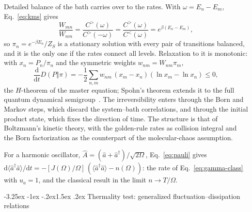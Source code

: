 \documentclass[10pt,a4paper]{article}
\makeatletter
\renewcommand{\subsection}{\@startsection{subsection}{2}{\z@}%
  {-3.25ex \@plus -1ex \@minus -.2ex}{1.5ex \@plus .2ex}%
  {\normalfont\fontsize{15.5pt}{19pt}\selectfont\bfseries}}
\newcommand{\dd}{\mathrm{d}}
\makeatother
\begin{document}
Detailed balance of the bath carries over to the rates.
With $ \omega = E_n - E_m $, Eq.~\eqref{eq:kms} gives
\begin{equation}
  \frac{W_{mn}}{W_{nm}} = \frac{C^>(\omega)}{C^>(-\omega)} = \frac{C^>(\omega)}{C^<(\omega)} = e^{\beta (E_n - E_m)} ,
  \label{eq:detailed-balance}
\end{equation}
so $ \pi_n = e^{-\beta E_n}/Z_S $ is a stationary solution with every pair of transitions balanced, and it is the only one if the rates connect all levels.
Relaxation to it is monotonic: with $ x_n = P_n/\pi_n $ and the symmetric weights $ w_{nm} = W_{nm}\pi_m $,
\begin{equation}
  \frac{\dd}{\dd t} D(P \Vert \pi) = -\frac12 \sum_{n,m} w_{nm} \, (x_m - x_n)(\ln x_m - \ln x_n) \le 0 ,
  \label{eq:h-theorem}
\end{equation}
the $ H $-theorem of the master equation; Spohn's theorem extends it to the full quantum dynamical semigroup~\cite{Spohn1978}.
The irreversibility enters through the Born and Markov steps, which discard the system--bath correlations, and through the initial product state, which fixes the direction of time.
The structure is that of Boltzmann's kinetic theory, with the golden-rule rates as collision integral and the Born factorization as the counterpart of the molecular-chaos assumption.

For a harmonic oscillator, $ \hat A = (\hat a + \hat a^\dagger)/\sqrt{2\Omega} $, Eq.~\eqref{eq:pauli} gives $ \dd\langle \hat a^\dagger \hat a\rangle/\dd t = -[J(\Omega)/\Omega] \, (\langle \hat a^\dagger\hat a\rangle - n(\Omega)) $: the rate of Eq.~\eqref{eq:gamma-class} with $ u_a = 1 $, and the classical result in the limit $ n \to T/\Omega $.

\subsection{Thermality test: generalized fluctuation--dissipation relations}
\label{sec:gen-fdt}
\end{document}
